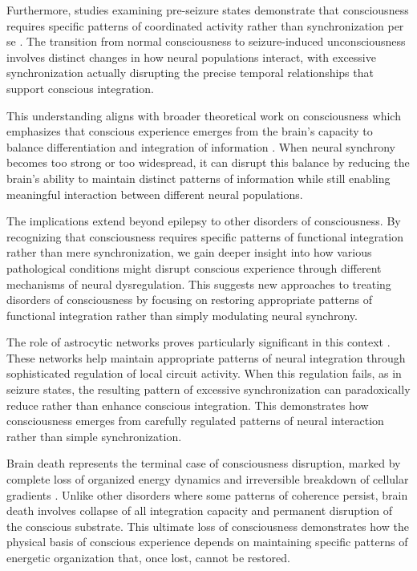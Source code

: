 Furthermore, studies examining pre-seizure states demonstrate that consciousness requires specific patterns of coordinated activity rather than synchronization per se \cite{LeVanQuyen2002}. The transition from normal consciousness to seizure-induced unconsciousness involves distinct changes in how neural populations interact, with excessive synchronization actually disrupting the precise temporal relationships that support conscious integration.

This understanding aligns with broader theoretical work on consciousness which emphasizes that conscious experience emerges from the brain's capacity to balance differentiation and integration of information \cite{Koch2016}. When neural synchrony becomes too strong or too widespread, it can disrupt this balance by reducing the brain's ability to maintain distinct patterns of information while still enabling meaningful interaction between different neural populations.

The implications extend beyond epilepsy to other disorders of consciousness. By recognizing that consciousness requires specific patterns of functional integration rather than mere synchronization, we gain deeper insight into how various pathological conditions might disrupt conscious experience through different mechanisms of neural dysregulation. This suggests new approaches to treating disorders of consciousness by focusing on restoring appropriate patterns of functional integration rather than simply modulating neural synchrony.

The role of astrocytic networks proves particularly significant in this context \cite{Tononi2015}. These networks help maintain appropriate patterns of neural integration through sophisticated regulation of local circuit activity. When this regulation fails, as in seizure states, the resulting pattern of excessive synchronization can paradoxically reduce rather than enhance conscious integration. This demonstrates how consciousness emerges from carefully regulated patterns of neural interaction rather than simple synchronization.

Brain death represents the terminal case of consciousness disruption, marked by complete loss of organized energy dynamics and irreversible breakdown of cellular gradients \cite{Wijdicks2010}. Unlike other disorders where some patterns of coherence persist, brain death involves collapse of all integration capacity and permanent disruption of the conscious substrate. This ultimate loss of consciousness demonstrates how the physical basis of conscious experience depends on maintaining specific patterns of energetic organization that, once lost, cannot be restored.

